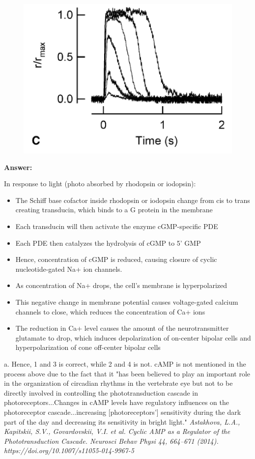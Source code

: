 \documentclass[letterpaper, 11pt]{article}
\begin{document}
\begin{figure}[htb!]
	\centering
	\includegraphics[width=0.6\linewidth]{2_fig.png}
	\label{fig2}
\end{figure}

\textbf{Answer:}

In response to light (photo absorbed by rhodopsin or iodopsin):
\begin{itemize}
	\item The Schiff base cofactor inside rhodopsin or iodopsin change from cis to trans creating transducin, which binds to a G protein in the membrane
	\item Each transducin will then activate the enzyme cGMP-specific PDE
	\item Each PDE then catalyzes the hydrolysis of cGMP to 5' GMP
	\item Hence, concentration of cGMP is reduced, causing closure of cyclic nucleotide-gated Na+ ion channels.
	\item As concentration of Na+ drops, the cell's membrane is hyperpolarized
	\item This negative change in membrane potential causes voltage-gated calcium channels to close, which reduces the concentration of Ca+ ions
	\item The reduction in Ca+ level causes the amount of the neurotransmitter glutamate to drop, which induces depolarization of on-center bipolar cells and hyperpolarization of cone off-center bipolar cells
\end{itemize}

a. Hence, 1 and 3 is correct, while 2 and 4 is not. cAMP is not mentioned in the process above due to the fact that it "has been believed to play an important role in the organization of circadian rhythms in the vertebrate eye but not to be directly involved in controlling the phototransduction cascade in photoreceptors...Changes in cAMP levels have regulatory influences on the photoreceptor cascade...increasing [photoreceptors'] sensitivity during the dark part of the day and decreasing its sensitivity in bright light." \textit{Astakhova, L.A., Kapitskii, S.V., Govardovskii, V.I. et al. Cyclic AMP as a Regulator of the Phototransduction Cascade. Neurosci Behav Physi 44, 664–671 (2014). https://doi.org/10.1007/s11055-014-9967-5}
\end{document}
